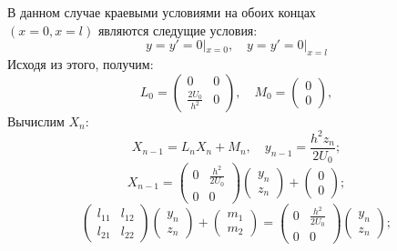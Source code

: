 \begin{enumerate}
\begin{enumerate}
			
			В данном случае краевыми условиями на обоих концах \\\((x=0,x=l)\) являются следущие условия:
			\begin{equation*}
			y=y'=0|_{x=0}, \quad y=y'=0|_{x=l}
			\end{equation*}
			Исходя из этого, получим:
			\begin{equation*}
			L_0=\left( \begin{matrix}0&0\\\frac{2U_0}{h^2}&0\end{matrix} \right),\quad
			M_0=\left( \begin{matrix}0\\0\end{matrix} \right),
			\end{equation*}
			Вычислим \(X_n\):
			\begin{equation*}
			X_{n-1}=L_nX_n+M_n,\quad y_{n-1}=\frac{h^2z_n}{2U_0};
			\end{equation*}
			\begin{equation*}
			X_{n-1}=\left(\begin{matrix}0&\frac{h^2}{2U_0}\\0&0\end{matrix}\right)\left(\begin{matrix}y_n\\z_n\end{matrix}\right)+\left(\begin{matrix}0\\0\end{matrix}\right);
			\end{equation*}
			\begin{equation*}
			\left(\begin{matrix}l_{11}&l_{12}\\l_{21}&l_{22}\end{matrix}\right)\left(\begin{matrix}y_n\\z_n\end{matrix}\right)+\left(\begin{matrix}m_1\\m_2\end{matrix}\right)=\left(\begin{matrix}0&\frac{h^2}{2U_0}\\0&0\end{matrix}\right)\left(\begin{matrix}y_n\\z_n\end{matrix}\right);

\end{equation*}
\end{enumerate}
\end{enumerate}
